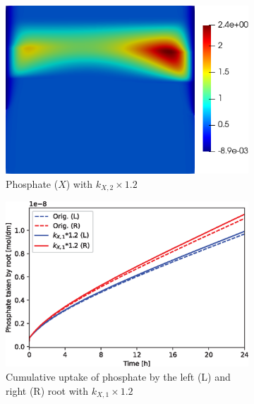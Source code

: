 \documentclass[11pt]{article}
\numberwithin{equation}{section}
\begin{document}
\begin{figure}[!htb]
\centering
\begin{subfigure}[t]{0.35\textwidth}
    \includegraphics[trim= 100 100 60 100,width=\textwidth]{Figures/X_kxup20.png}
    \caption{Phosphate ($X$) with $k_{X,2}\times 1.2$}
    \label{fig:numexp_kup1}
\end{subfigure}
\hspace{1cm}
\begin{subfigure}[t]{0.4\textwidth}
    \includegraphics[width=\textwidth]{Figures/kxup20.eps}
    \caption{Cumulative uptake of phosphate by the left (L) and right (R) root with $k_{X,1}\times 1.2$}
    \label{fig:numexp_kup2}
\end{subfigure}
\qquad
\begin{subfigure}[t]{0.35\textwidth}

\end{subfigure}
\end{figure}
\end{document}

